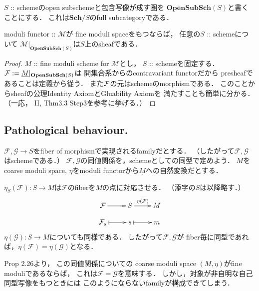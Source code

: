 \documentclass[a4paper]{jsarticle}
\newcommand{\Sch}{\mathbf{Sch}}
\newcommand{\OpenSubSch}{\mathbf{OpenSubSch}}
\newcommand{\famF}{\mathcal{F}}
\newcommand{\famG}{\mathcal{G}}
\newcommand{\func}[1]{\underline{#1}}
\newcommand{\ftorM}{\mathcal{M}}
\begin{document}
    \begin{Prop}
        $S$ :: schemeのopen subschemeと包含写像が成す圏を
        $\OpenSubSch(S)$と書くことにする．
        これは$\Sch/S$のfull subcategoryである．

        moduli functor :: $\ftorM$が
        fine moduli spaceをもつならば，
        任意の$S$ :: schemeについて
        $\ftorM|_{\OpenSubSch(S)}$は$S$上のsheafである．
    \end{Prop}
    \begin{proof}
        $M$ :: fine moduli scheme for $\ftorM$とし，
        $S$ :: schemeを固定する．
        $\shF:=\func{M}|_{\OpenSubSch(S)}$は
        開集合系からのcontravariant functorだから
        presheafであることは定義から従う．
        また$\mathcal{F}$の元はschemeのmorphismである．
        このことからsheafの公理Identity AxiomとGluability Axiomを
        満たすことも簡単に分かる．
        （一応，\cite{HarAG} II, Thm3.3 Step3を参考に挙げる．）
    \end{proof}

    \subsection{Pathological behaviour.}
    $\famF, \famG \to S$をfiber of morphismで実現されるfamilyだとする．
    （したがって$\famF, \famG$はschemeである．）
    $\famF, \famG$の同値関係を，schemeとしての同型で定めよう．
    $M$をcoarse moduli space, 
    $\eta$をmoduli functorから$\func{M}$への自然変換だとする．

    $\eta_S(\famF): S \to M$は$\famF$のfiberを$M$の点に対応させる．
    （添字の$S$は以降略す．）
    \[
    \xymatrix@R=10pt
    {
        \famF \ar[r]& S \ar[r]^-{\eta(\famF)}& M \\
        \famF_s \ar@{{|}->}[r]& s \ar@{{|}->}[r]& m
    }
    \]
    $\eta(\famG): S \to M$についても同様である．
    したがって$\famF, \famG$が
    fiber毎に同型であれば，$\eta(\famF)=\eta(\famG)$となる．

    \cite{Hos} Prop 2.26より，
    この同値関係についての
    coarse moduli space $(M, \eta)$がfine moduliであるならば，
    これは$\famF=\famG$を意味する．
    しかし，対象が非自明な自己同型写像をもつときには
    このようにならないfamilyが構成できてしまう．
\end{document}
